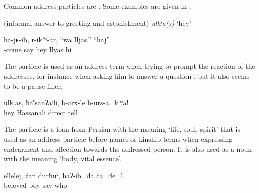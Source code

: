 Common address particles are . Some examples are given in .
%
\begin{exe}
	\ex	\label{ex:pause fillers interjections minor}
	\begin{xlist}
		\ex	{} 	
		\ex	{}  (informal answer to greeting and astonishment)	
		\ex	{} 	
		\ex \textit{ulkːa(s)} `hey'
		\ex	{} 	
	\end{xlist}

	\ex	\label{ex:‎He came, and she said (to him), Hey Iljas. (He said), Hi minor}
	\gll	ha-jʁ-ib,	r-ik'ʷ-ar,	``wa	Iljas.''	``haj''\\
		-come	say	hey	Ilyas		hi\\
	\glt	{}

\end{exe}

The particle  is used as an address term when trying to prompt the reaction of the addressee, for instance when asking him to answer a question , but it also seems to be a pause filler. 

%
\begin{exe}
	\ex	\label{ex:Hey, Hasanali, tell the truth minor}
	\gll	ulkːas,	ħaˁsanʡaˁli,	b-arx-le	b-urs-a=kːʷa!\\
		hey	Hassanali	direct	tell\\
	\glt	{}
\end{exe}

The particle   is a loan from Persian with the meaning `life, soul, spirit' that is used as an address particle before names or kinship terms when expressing endearment and affection towards the addressed person. It is also used as a noun with the meaning `body, vital essence'.

\begin{exe}
	\ex	\label{ex:‎Ooh, my dear boy, I thought, who are you minor}
	\gll	ellelej,	žan	durħuˁ,	haʔ-ib=da	ča=de=l\\
		 beloved	boy	say	who\\
	\glt	{}
\end{exe}

